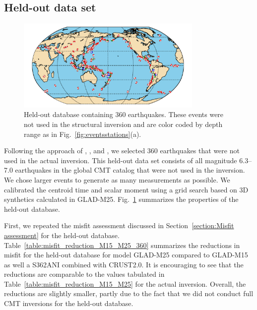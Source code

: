 \documentclass[extra,mreferee]{gji}
\begin{document}
\subsection{Held-out data set}

\begin{figure}
  \centering
  \includegraphics[width=0.8\textwidth]{figures/events_360.pdf}
  \caption{\small{Held-out database containing 360 earthquakes. These events were not used in the structural inversion and are color coded by depth range as in Fig.~\ref{fig:eventsstations}(a).}}
  \label{fig:events_360}
\end{figure}

Following the approach of \cite{tape2009adjoint}, \cite{chen2015multiparameter},
and \cite{bozdaug2016global}, we selected 360 earthquakes that were not used
in the actual inversion. This held-out data set consists of all magnitude 6.3--7.0
earthquakes in the global CMT catalog that were not used in the inversion.
We chose larger events to generate as many measurements as possible.
We calibrated the centroid time and scalar moment using a grid search based on
3D synthetics calculated in GLAD-M25.
Fig.~\ref{fig:events_360} summarizes the properties of the held-out database.

First, we repeated the misfit assessment discussed in
Section~\ref{section:Misfit assessment} for the held-out database.
Table~\ref{table:misfit_reduction_M15_M25_360} summarizes the reductions
in misfit for the held-out database for model GLAD-M25 compared to GLAD-M15
as well a S362ANI combined with CRUST2.0.
It is encouraging to see that the reductions are comparable to the
values tabulated in Table~\ref{table:misfit_reduction_M15_M25} for the actual inversion.
Overall, the reductions are slightly smaller, partly due to the fact that we did not
conduct full CMT inversions for the held-out database.
\end{document}
